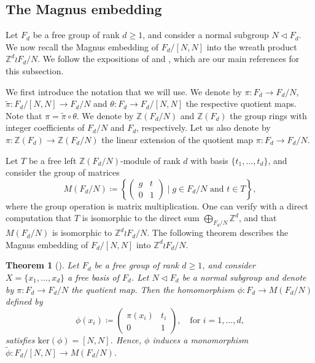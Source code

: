 \documentclass[reqno,oneside,11pt]{amsart}
\newcommand{\Z}{\mathbb{Z}}
\theoremstyle{plain}
\newtheorem{thm}{Theorem}[section] %
\theoremstyle{definition}
\begin{document}
\subsection{The Magnus embedding}\label{subsection: magnus}
Let $F_d$ be a free group of rank $d\ge 1$, and consider a normal subgroup $N\lhd F_d$. We now recall the Magnus embedding of $F_d/[N,N]$ into the wreath product $\Z^d\wr F_d/N$. We follow the expositions of \cite[Subsections 2.2 -- 2.5]{MyasnikovRomankovUshakovVershik2010} and \cite[Section 2]{SaloffCosteZheng2015}, which are our main references for this subsection.

We first introduce the notation that we will use. We denote by $\pi:F_d\to F_d/N$, $\widetilde{\pi}:F_d/[N,N]\to F_d/N$ and $\theta:F_d\to F_d/[N,N]$ the respective quotient maps. Note that $\pi = \widetilde{\pi} \circ \theta$. We denote by $\Z(F_d/N)$ and $\Z(F_d)$ the group rings with integer coefficients of $F_d/N$ and $F_d$, respectively. Let us also denote by $\pi:\Z(F_d)\to \Z(F_d/N)$ the linear extension of the quotient map $\pi:F_d\to F_d/N$.

Let $T$ be a free left $\Z(F_d/N)$-module of rank $d$ with basis $\{t_1,\ldots,t_d\}$, and consider the group of matrices
\[
M(F_d/N)\coloneqq \left\{ \begin{pmatrix}
	g & t \\ 0 & 1
\end{pmatrix}  \mid g\in F_d/N \text{ and }t\in T \right\},
\]
where the group operation is matrix multiplication. One can verify with a direct computation that $T$ is isomorphic to the direct sum $\bigoplus_{F_d/N}\Z^d$, and that $M(F_d/N)$ is isomorphic to $\Z^d\wr F_d/N$. The following theorem describes the Magnus embedding of $F_d/[N,N]$ into $\Z^d\wr F_d/N$.
\begin{thm}[{\cite{Magnus1939}}]\label{thm: original formulation Magnus embedding} Let $F_d$ be a free group of rank $d\ge 1$, and consider $X=\{x_1,\ldots,x_d\}$ a free basis of $F_d$. Let $N\lhd F_d$ be a normal subgroup and denote by $\pi:F_d\to F_d/N$ the quotient map. Then the homomorphism $\phi:F_d\to M(F_d/N)$ defined by
	\begin{equation*}
		\phi(x_i)\coloneqq \begin{pmatrix}
			\pi(x_i) & t_i \\
			0 & 1
		\end{pmatrix}, \ \ \ \text{ for }i=1,\ldots,d,
	\end{equation*}
satisfies $\mathrm{ker}(\phi)=[N,N]$. Hence, $\phi$ induces a monomorphism $\widetilde{\phi}:F_d/[N,N]\to M(F_d/N)$.
\end{thm}
\end{document}
